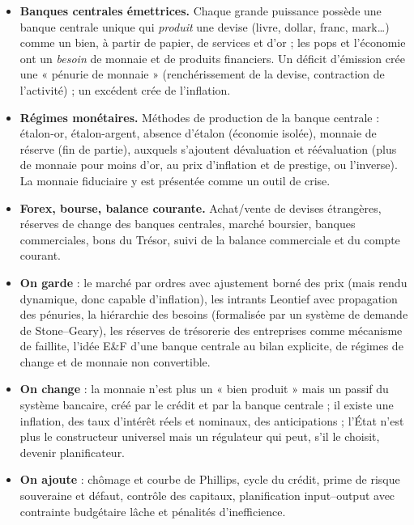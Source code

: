 \documentclass[11pt,a4paper]{article}
\newcommand{\og}{« }
\newcommand{\fg}{ »}
\begin{document}
\begin{vic}
\begin{itemize}
\item \textbf{Banques centrales émettrices.} Chaque grande puissance possède une banque centrale unique qui \emph{produit} une devise (livre, dollar, franc, mark\ldots) comme un bien, à partir de papier, de services et d'or ; les pops et l'économie ont un \emph{besoin} de monnaie et de produits financiers. Un déficit d'émission crée une \og pénurie de monnaie\fg{} (renchérissement de la devise, contraction de l'activité) ; un excédent crée de l'inflation.
\item \textbf{Régimes monétaires.} Méthodes de production de la banque centrale : étalon-or, étalon-argent, absence d'étalon (économie isolée), monnaie de réserve (fin de partie), auxquels s'ajoutent dévaluation et réévaluation (plus de monnaie pour moins d'or, au prix d'inflation et de prestige, ou l'inverse). La monnaie fiduciaire y est présentée comme un outil de crise.
\item \textbf{Forex, bourse, balance courante.} Achat/vente de devises étrangères, réserves de change des banques centrales, marché boursier, banques commerciales, bons du Trésor, suivi de la balance commerciale et du compte courant.
\end{itemize}
\end{vic}

\begin{design}
\begin{itemize}
\item \textbf{On garde} : le marché par ordres avec ajustement borné des prix (mais rendu dynamique, donc capable d'inflation), les intrants Leontief avec propagation des pénuries, la hiérarchie des besoins (formalisée par un système de demande de Stone--Geary), les réserves de trésorerie des entreprises comme mécanisme de faillite, l'idée E\&F d'une banque centrale au bilan explicite, de régimes de change et de monnaie non convertible.
\item \textbf{On change} : la monnaie n'est plus un \og bien produit\fg{} mais un passif du système bancaire, créé par le crédit et par la banque centrale ; il existe une inflation, des taux d'intérêt réels et nominaux, des anticipations ; l'État n'est plus le constructeur universel mais un régulateur qui peut, s'il le choisit, devenir planificateur.
\item \textbf{On ajoute} : chômage et courbe de Phillips, cycle du crédit, prime de risque souveraine et défaut, contrôle des capitaux, planification input--output avec contrainte budgétaire lâche et pénalités d'inefficience.
\end{itemize}
\end{design}
\end{document}
